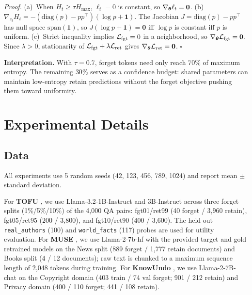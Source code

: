 \noindent\textit{Proof.}
(a)~When $H_t \geq \tau H_\mathrm{max}$, $\ell_t = 0$ is constant, so $\nabla_{\boldsymbol{\theta}} \ell_t = \mathbf{0}$.
(b)~$\nabla_{z_t} H_t = -(\mathrm{diag}(p) - pp^\top)(\log p + \mathbf{1})$. The Jacobian $J = \mathrm{diag}(p) - pp^\top$ has null space $\mathrm{span}(\mathbf{1})$, so $J(\log p + \mathbf{1}) = \mathbf{0}$ iff $\log p$ is constant iff $p$ is uniform.
(c)~Strict inequality implies $\mathcal{L}_\mathrm{fgt} = 0$ in a neighborhood, so $\nabla_{\boldsymbol{\theta}} \mathcal{L}_\mathrm{fgt} = \mathbf{0}$. Since $\lambda > 0$, stationarity of $\mathcal{L}_\mathrm{fgt} + \lambda \mathcal{L}_\mathrm{ret}$ gives $\nabla_{\boldsymbol{\theta}} \mathcal{L}_\mathrm{ret} = \mathbf{0}$.
\hfill$\square$

\smallskip
\noindent\textbf{Interpretation.}
With $\tau = 0.7$, forget tokens need only reach $70\%$ of maximum entropy. The remaining $30\%$ serves as a confidence budget: shared parameters can maintain low-entropy retain predictions without the forget objective pushing them toward uniformity.


\section{Experimental Details}
\label{app:details}

\subsection{Data}
\label{app:data}

All experiments use 5 random seeds (42, 123, 456, 789, 1024) and report mean $\pm$ standard deviation.

For \textbf{TOFU} \citep{maini2024tofu}, we use Llama-3.2-1B-Instruct and 3B-Instruct across three forget splits (1\%/5\%/10\%) of the 4{,}000 QA pairs: fgt01/ret99 (40 forget / 3{,}960 retain), fgt05/ret95 (200 / 3{,}800), and fgt10/ret90 (400 / 3{,}600). The held-out \texttt{real\_authors} (100) and \texttt{world\_facts} (117) probes are used for utility evaluation.
For \textbf{MUSE} \citep{shi2025muse}, we use Llama-2-7b-hf \citep{touvron2023llama} with the provided target and gold retrained models on the News split (889 forget / 1{,}777 retain documents) and Books split (4 / 12 documents); raw text is chunked to a maximum sequence length of 2{,}048 tokens during training.
For \textbf{KnowUndo} \citep{tian2024knowundo}, we use Llama-2-7B-chat on the Copyright domain (403 train / 74 val forget; 901 / 212 retain) and Privacy domain (400 / 110 forget; 441 / 108 retain).

